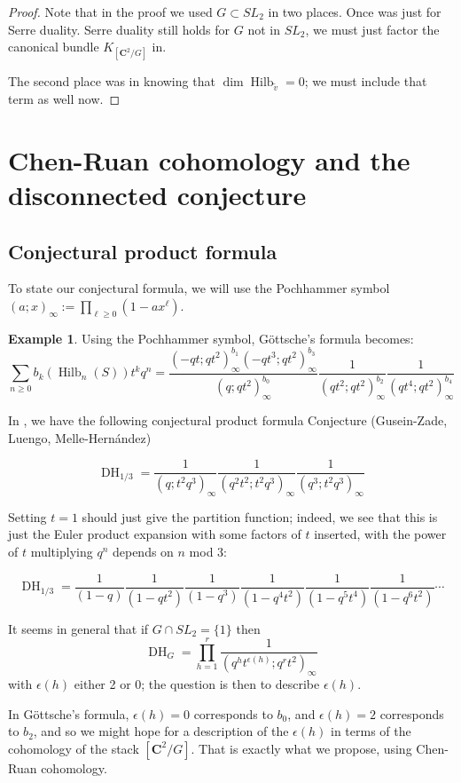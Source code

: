 \documentclass{amsart}[12pt]
\theoremstyle{definition}
\newtheorem{example}[dummy]{Example}
\newcommand{\C}{\mathbf{C}}
\DeclareMathOperator{\Hilb}{Hilb}
\DeclareMathOperator{\DC}{DH}
\begin{document}
\begin{proof}
Note that in the proof we used $G\subset SL_2$ in two places.  Once was just for Serre duality.  Serre duality still holds for $G$ not in $SL_2$, we must just factor the canonical bundle $K_{[\C^2/G]}$ in.

The second place was in knowing that $\dim \Hilb_{\tilde{v}}=0$; we must include that term as well now.

\end{proof}
\section{Chen-Ruan cohomology and the disconnected conjecture}


\subsection{Conjectural product formula}

To state our conjectural formula, we will use the Pochhammer symbol $(a;x)_\infty:=\prod_{\ell\geq 0} (1-ax^\ell)$.
\begin{example}
Using the Pochhammer symbol, G\"ottsche's formula becomes:
$$\sum_{n\geq 0} b_k(\Hilb_n(S))t^kq^n=\frac{(-qt;qt^2)_\infty^{b_1}(-qt^3;qt^2)_\infty^{b_3}}{(q;qt^2)_\infty^{b_0}}\frac{1}{(qt^2;qt^2)_\infty^{b_2}}\frac{1}{(qt^4;qt^2)_\infty^{b_4}}$$
\end{example}

In \cite{GLMequivariant}, we have the following conjectural product formula 
{Conjecture (Gusein-Zade, Luengo, Melle-Hern\'andez)}

$$\DC_{1/3}=\frac{1}{(q;t^2q^3)_\infty}\frac{1}{(q^2t^2;t^2q^3)_\infty}\frac{1}{(q^3;t^2q^3)_\infty}$$

Setting $t=1$ should just give the partition function; indeed, we see that this is just the Euler product expansion with some factors of $t$ inserted, with the power of $t$ multiplying $q^n$ depends on $n$ mod 3:

$$\DC_{1/3}=\frac{1}{(1-q)}\frac{1}{(1-qt^2)}\frac{1}{(1-q^3)}\frac{1}{(1-q^4t^2)}
\frac{1}{(1-q^5t^4)}\frac{1}{(1-q^6t^2)}\cdots$$

 It seems in general that if $G\cap SL_2=\{1\}$ then
$$\DC_{G}=\prod_{h=1}^r \frac{1}{(q^h t^{\epsilon(h)}; q^r t^2)_\infty}$$
with $\epsilon(h)$ either 2 or 0; the question is then to describe $\epsilon(h)$.

In G\"ottsche's formula, $\epsilon(h)=0$ corresponds to $b_0$, and $\epsilon(h)=2$ corresponds to $b_2$, and so we might hope for a description of the $\epsilon(h)$ in terms of the cohomology of the stack $[\C^2/G]$.  That is exactly what we propose, using Chen-Ruan cohomology.
\end{document}
